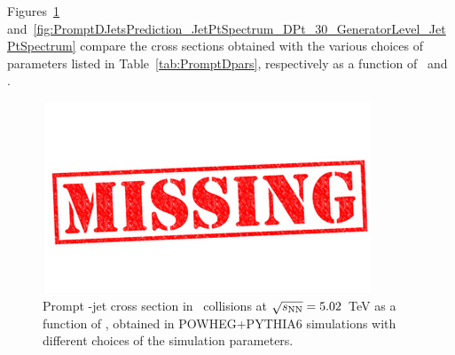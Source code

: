     
Figures~\ref{fig:PromptDJetsPrediction_DPtSpectrum_GeneratorLevel_DPtSpectrum} and~\ref{fig:PromptDJetsPrediction_JetPtSpectrum_DPt_30_GeneratorLevel_JetPtSpectrum} compare the cross sections obtained
with the various choices of parameters listed in Table~\ref{tab:PromptDpars}, respectively as a function of \ptd\ and \ptchjet. 

\begin{figure}[bth]
\begin{center}
\includegraphics[width=.2\textwidth]{missing}
\caption{Prompt \Dstar-jet cross section in \pPb\ collisions at $\sqrt{s_{\rm NN}}=5.02$~TeV as a function of \ptd, obtained in POWHEG+PYTHIA6 simulations
with different choices of the simulation parameters.} 
\label{fig:PromptDJetsPrediction_DPtSpectrum_GeneratorLevel_DPtSpectrum}
\end{center}
\end{figure}

